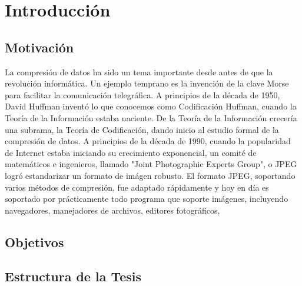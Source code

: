 \chapter{Introducción}\label{ch:introduction}


\section{Motivación}

La compresión de datos ha sido un tema importante desde antes de que la revolución informática. Un ejemplo temprano es la invención de la clave Morse para facilitar la comunicación telegráfica. A principios de la década de 1950, David Huffman inventó lo que conocemos como Codificación Huffman, cuando la Teoría de la Información estaba naciente. De la Teoría de la Información crecería una subrama, la Teoría de Codificación, dando inicio al estudio formal de la compresión de datos.
A principios de la década de 1990, cuando la popularidad de Internet estaba iniciando su crecimiento exponencial, un comité de matemáticos e ingenieros, llamado "Joint Photographic Experts Group", o JPEG logró estandarizar un formato de imágen robusto. El formato JPEG, soportando varios métodos de compresión, fue adaptado rápidamente y hoy en día es soportado por prácticamente todo programa que soporte imágenes, incluyendo navegadores, manejadores de archivos, editores fotográficos,

\section{Objetivos}

\section{Estructura de la Tesis}

